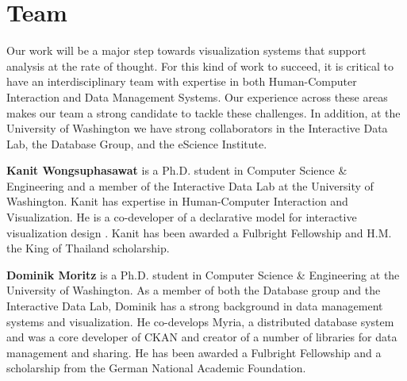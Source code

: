 \section*{Team}

Our work will be a major step towards visualization systems that support analysis at the rate of thought.  For this kind of work to succeed, it is critical to have an interdisciplinary team with expertise in both Human-Computer Interaction and Data Management Systems. Our experience across these areas makes our team a strong candidate to tackle these challenges.  In addition, at the University of Washington we have strong collaborators in the Interactive Data Lab, the Database Group, and the eScience Institute.

\textbf{Kanit Wongsuphasawat} is a Ph.D. student in Computer Science \& Engineering and a member of the Interactive Data Lab at the University of Washington.  Kanit has expertise in Human-Computer Interaction and Visualization.  He is a co-developer of a declarative model for interactive visualization design \cite{satyanarayan:reactive-vega}.  Kanit has been awarded a Fulbright Fellowship and H.M. the King of Thailand scholarship.

\textbf{Dominik Moritz} is a Ph.D. student in Computer Science \& Engineering at the University of Washington.   As a member of both the Database group and the Interactive Data Lab, Dominik has a strong background in data management systems and visualization.  He co-develops Myria, a distributed database system \cite{halperin:myria} and was a core developer of CKAN and creator of a number of libraries for data management and sharing. He has been awarded a Fulbright Fellowship and a scholarship from the German National Academic Foundation.